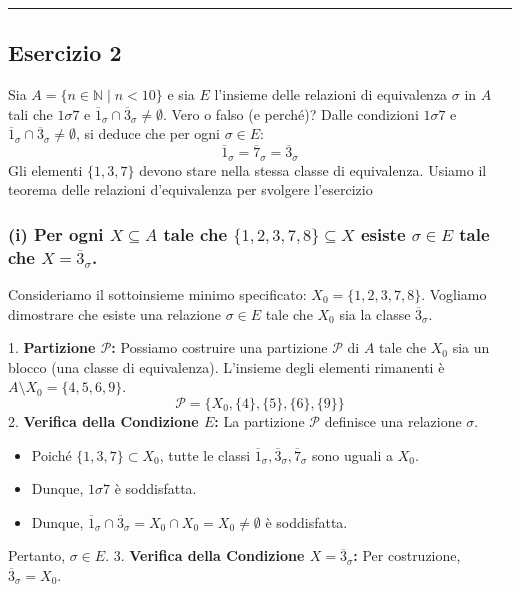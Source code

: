 \vspace{0.5cm}
\hrule
\vspace{0.5cm}

\subsection*{Esercizio 2}

Sia $A = \{n \in \mathbb{N} \mid n < 10\}$ e sia $E$ l'insieme delle relazioni di equivalenza $\sigma$ in $A$ tali che $1 \sigma 7$ e $\overline{1}_{\sigma} \cap \overline{3}_{\sigma} \neq \emptyset$. Vero o falso (e perché)?
Dalle condizioni $1 \sigma 7$ e $\overline{1}_{\sigma} \cap \overline{3}_{\sigma} \neq \emptyset$, si deduce che per ogni $\sigma \in E$:
$$ \overline{1}_{\sigma} = \overline{7}_{\sigma} = \overline{3}_{\sigma} $$
Gli elementi $\{1, 3, 7\}$ devono stare nella stessa classe di equivalenza. Usiamo il teorema delle relazioni d'equivalenza per svolgere l'esercizio

\subsubsection*{(i) Per ogni $X \subseteq A$ tale che $\{1, 2, 3, 7, 8\} \subseteq X$ esiste $\sigma \in E$ tale che $X = \overline{3}_{\sigma}$.}

Consideriamo il sottoinsieme minimo specificato: $X_0 = \{1, 2, 3, 7, 8\}$. Vogliamo dimostrare che esiste una relazione $\sigma \in E$ tale che $X_0$ sia la classe $\overline{3}_{\sigma}$.

1.  \textbf{Partizione $\mathcal{P}$:} Possiamo costruire una partizione $\mathcal{P}$ di $A$ tale che $X_0$ sia un blocco (una classe di equivalenza). L'insieme degli elementi rimanenti è $A \setminus X_0 = \{4, 5, 6, 9\}$.
    $$\mathcal{P} = \{ X_0, \{4\}, \{5\}, \{6\}, \{9\} \}$$
2.  \textbf{Verifica della Condizione $E$:} La partizione $\mathcal{P}$ definisce una relazione $\sigma$.
    \begin{itemize}
        \item Poiché $\{1, 3, 7\} \subset X_0$, tutte le classi $\overline{1}_{\sigma}, \overline{3}_{\sigma}, \overline{7}_{\sigma}$ sono uguali a $X_0$.
        \item Dunque, $1 \sigma 7$ è soddisfatta.
        \item Dunque, $\overline{1}_{\sigma} \cap \overline{3}_{\sigma} = X_0 \cap X_0 = X_0 \neq \emptyset$ è soddisfatta.
    \end{itemize}
    Pertanto, $\sigma \in E$.
3.  \textbf{Verifica della Condizione $X = \overline{3}_{\sigma}$:} Per costruzione, $\overline{3}_{\sigma} = X_0$.

